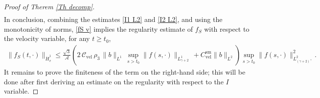 \documentclass[11pt,a4paper]{amsart}
\newcommand{\g}{\gamma}
\newcommand{\Ls}{L^1}
\newcommand{\mA}{\mathcal{A}}
\newcommand{\fS}{f_S}
\newcommand{\Csvel}{C_{\text{vel}}^{\text{sm}}}
\newcommand{\Clvel}{\mathcal{C}_{\text{vel}}}
\begin{document}
\begin{proof}[Proof of Therem \ref{Th decomp}]
\begin{equation}
\begin{split}
	\end{split}
\end{equation}
In conclusion,  combining the estimates \eqref{I1 L2} and \eqref{I2 L2}, and using the monotonicity of norms, \eqref{fS v} implies the regularity estimate of $\fS$ with respect to the velocity variable,  for any $t \geq t_0$,
\begin{multline}\label{v reg of fS}
	\| 	\fS(t,\cdot) \|_{\dot{H}^{1}_{ v}} \leq \frac{\sqrt{3}}{\mA} 
 \left(  2 \, \Clvel  \,    \rho_3 \,  	\| b \|_{\Ls}\, \sup_{s>t_0}	\| f(s,\cdot) \|_{L^{1}_{\g+2}} \, +   \Csvel \|b\|_{L^{2}} \right) \sup_{s >t_0 } \| f(s,\cdot) \|^2_{L^{2}_{(\gamma+2)^+}}.
\end{multline}
It remains to prove the finiteness of the term on the right-hand side; this will be done after first deriving an estimate on the regularity with respect to the $I$ variable.


\end{proof}
\end{document}
